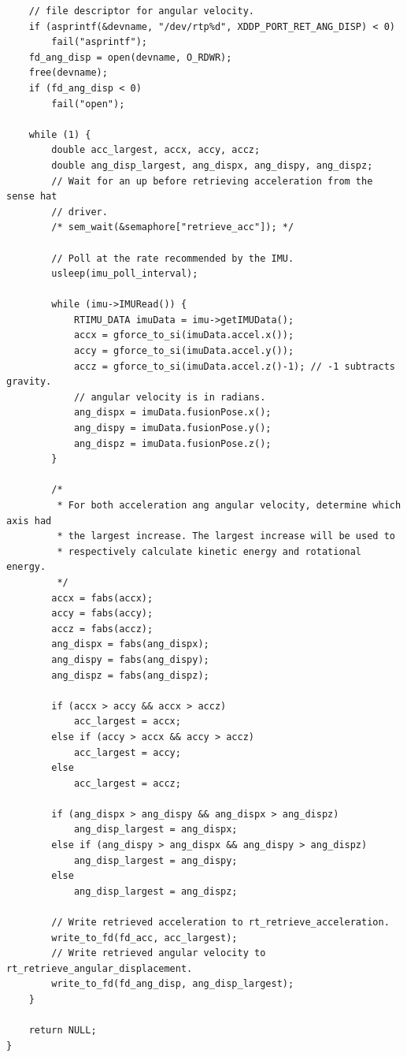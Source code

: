\documentclass[12pt]{scrreprt}
\begin{document}
\begin{appendices}
\begin{verbatim}
    // file descriptor for angular velocity.
    if (asprintf(&devname, "/dev/rtp%d", XDDP_PORT_RET_ANG_DISP) < 0)
        fail("asprintf");
    fd_ang_disp = open(devname, O_RDWR);
    free(devname);
    if (fd_ang_disp < 0)
        fail("open");

    while (1) {
        double acc_largest, accx, accy, accz;
        double ang_disp_largest, ang_dispx, ang_dispy, ang_dispz;
        // Wait for an up before retrieving acceleration from the sense hat
        // driver.
        /* sem_wait(&semaphore["retrieve_acc"]); */

        // Poll at the rate recommended by the IMU.
        usleep(imu_poll_interval);

        while (imu->IMURead()) {
            RTIMU_DATA imuData = imu->getIMUData();
            accx = gforce_to_si(imuData.accel.x());
            accy = gforce_to_si(imuData.accel.y());
            accz = gforce_to_si(imuData.accel.z()-1); // -1 subtracts gravity.
            // angular velocity is in radians.
            ang_dispx = imuData.fusionPose.x();
            ang_dispy = imuData.fusionPose.y();
            ang_dispz = imuData.fusionPose.z();
        }

        /*
         * For both acceleration ang angular velocity, determine which axis had
         * the largest increase. The largest increase will be used to
         * respectively calculate kinetic energy and rotational energy.
         */
        accx = fabs(accx);
        accy = fabs(accy);
        accz = fabs(accz);
        ang_dispx = fabs(ang_dispx);
        ang_dispy = fabs(ang_dispy);
        ang_dispz = fabs(ang_dispz);

        if (accx > accy && accx > accz)
            acc_largest = accx;
        else if (accy > accx && accy > accz)
            acc_largest = accy;
        else
            acc_largest = accz;

        if (ang_dispx > ang_dispy && ang_dispx > ang_dispz)
            ang_disp_largest = ang_dispx;
        else if (ang_dispy > ang_dispx && ang_dispy > ang_dispz)
            ang_disp_largest = ang_dispy;
        else
            ang_disp_largest = ang_dispz;

        // Write retrieved acceleration to rt_retrieve_acceleration.
        write_to_fd(fd_acc, acc_largest);
        // Write retrieved angular velocity to rt_retrieve_angular_displacement.
        write_to_fd(fd_ang_disp, ang_disp_largest);
    }

    return NULL;
}


\end{verbatim}


\end{appendices}
\end{document}
